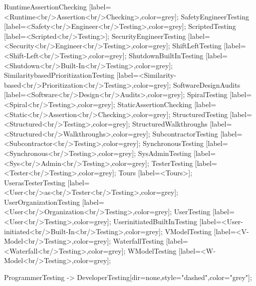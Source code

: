 \documentclass{article}
\begin{document}
{RuntimeAssertionChecking [label=<Runtime<br/>Assertion<br/>Checking>,color=grey];
SafetyEngineerTesting [label=<Safety<br/>Engineer<br/>Testing>,color=grey];
ScriptedTesting [label=<Scripted<br/>Testing>];
SecurityEngineerTesting [label=<Security<br/>Engineer<br/>Testing>,color=grey];
ShiftLeftTesting [label=<Shift-Left<br/>Testing>,color=grey];
ShutdownBuiltInTesting [label=<Shutdown<br/>Built-In<br/>Testing>,color=grey];
SimilaritybasedPrioritizationTesting [label=<Similarity-based<br/>Prioritization<br/>Testing>,color=grey];
SoftwareDesignAudits [label=<Software<br/>Design<br/>Audits>,color=grey];
SpiralTesting [label=<Spiral<br/>Testing>,color=grey];
StaticAssertionChecking [label=<Static<br/>Assertion<br/>Checking>,color=grey];
StructuredTesting [label=<Structured<br/>Testing>,color=grey];
StructuredWalkthroughs [label=<Structured<br/>Walkthroughs>,color=grey];
SubcontractorTesting [label=<Subcontractor<br/>Testing>,color=grey];
SynchronousTesting [label=<Synchronous<br/>Testing>,color=grey];
SysAdminTesting [label=<Sys<br/>Admin<br/>Testing>,color=grey];
TesterTesting [label=<Tester<br/>Testing>,color=grey];
Tours [label=<Tours>];
UserasTesterTesting [label=<User<br/>as<br/>Tester<br/>Testing>,color=grey];
UserOrganizationTesting [label=<User<br/>Organization<br/>Testing>,color=grey];
UserTesting [label=<User<br/>Testing>,color=grey];
UserinitiatedBuiltInTesting [label=<User-initiated<br/>Built-In<br/>Testing>,color=grey];
VModelTesting [label=<V-Model<br/>Testing>,color=grey];
WaterfallTesting [label=<Waterfall<br/>Testing>,color=grey];
WModelTesting [label=<W-Model<br/>Testing>,color=grey];

ProgrammerTesting -> DeveloperTesting[dir=none,style="dashed",color="grey"];

}
\end{document}
